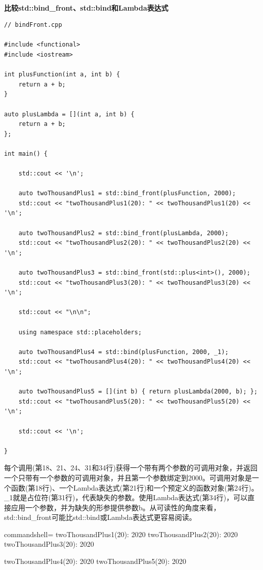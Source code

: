 \hspace*{\fill} \\ %
\noindent
\textbf{比较std::bind\_front、std::bind和Lambda表达式}
\begin{lstlisting}[style=styleCXX]
// bindFront.cpp

#include <functional>
#include <iostream>

int plusFunction(int a, int b) {
	return a + b;
}

auto plusLambda = [](int a, int b) {
	return a + b;
};

int main() {

	std::cout << '\n';
	
	auto twoThousandPlus1 = std::bind_front(plusFunction, 2000);
	std::cout << "twoThousandPlus1(20): " << twoThousandPlus1(20) << '\n';
	
	auto twoThousandPlus2 = std::bind_front(plusLambda, 2000);
	std::cout << "twoThousandPlus2(20): " << twoThousandPlus2(20) << '\n';
	
	auto twoThousandPlus3 = std::bind_front(std::plus<int>(), 2000);
	std::cout << "twoThousandPlus3(20): " << twoThousandPlus3(20) << '\n';
	
	std::cout << "\n\n";
	
	using namespace std::placeholders;
	
	auto twoThousandPlus4 = std::bind(plusFunction, 2000, _1);
	std::cout << "twoThousandPlus4(20): " << twoThousandPlus4(20) << '\n';
	
	auto twoThousandPlus5 = [](int b) { return plusLambda(2000, b); };
	std::cout << "twoThousandPlus5(20): " << twoThousandPlus5(20) << '\n';
	
	std::cout << '\n';

}
\end{lstlisting}

每个调用(第18、21、24、31和34行)获得一个带有两个参数的可调用对象，并返回一个只带有一个参数的可调用对象，并且第一个参数绑定到2000。可调用对象是一个函数(第18行)、一个Lambda表达式(第21行)和一个预定义的函数对象(第24行)。\_1就是占位符(第31行)，代表缺失的参数。使用Lambda表达式(第34行)，可以直接应用一个参数，并为缺失的形参提供参数b。从可读性的角度来看，std::bind\_front可能比std::bind或Lambda表达式更容易阅读。

\begin{tcblisting}{commandshell={}}
twoThousandPlus1(20): 2020
twoThousandPlus2(20): 2020
twoThousandPlus3(20): 2020

twoThousandPlus4(20): 2020
twoThousandPlus5(20): 2020
\end{tcblisting}

